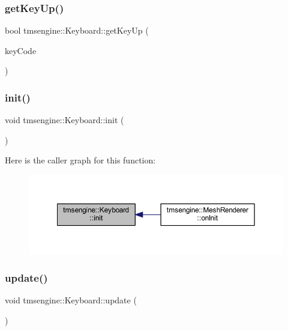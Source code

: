 \subsubsection{\texorpdfstring{get\+Key\+Up()}{getKeyUp()}}
{\footnotesize\ttfamily bool tmsengine\+::\+Keyboard\+::get\+Key\+Up (\begin{DoxyParamCaption}\item[{S\+D\+L\+\_\+\+Scancode}]{key\+Code }\end{DoxyParamCaption})}

\mbox{\label{classtmsengine_1_1_keyboard_a4f06c5af1c66b1068eb588fffa90aea2}} 
\subsubsection{\texorpdfstring{init()}{init()}}
{\footnotesize\ttfamily void tmsengine\+::\+Keyboard\+::init (\begin{DoxyParamCaption}{ }\end{DoxyParamCaption})}

Here is the caller graph for this function\+:\nopagebreak
\begin{figure}[H]
\begin{center}
\leavevmode
\includegraphics[width=350pt]{classtmsengine_1_1_keyboard_a4f06c5af1c66b1068eb588fffa90aea2_icgraph}
\end{center}
\end{figure}
\mbox{\label{classtmsengine_1_1_keyboard_a61b823821007a6583b277cf0622b201f}} 
\subsubsection{\texorpdfstring{update()}{update()}}
{\footnotesize\ttfamily void tmsengine\+::\+Keyboard\+::update (\begin{DoxyParamCaption}{ }\end{DoxyParamCaption})}

